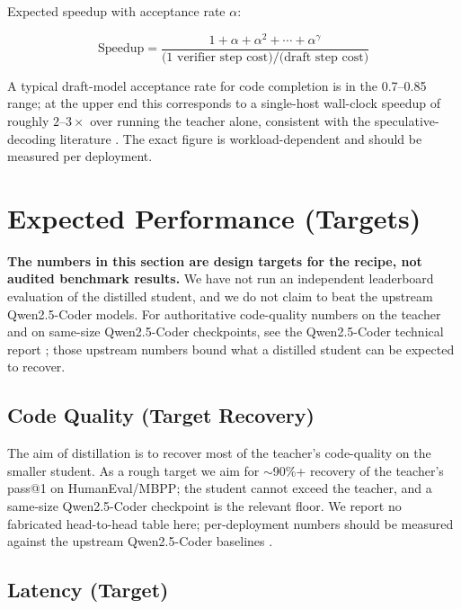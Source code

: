\documentclass[11pt,a4paper]{article}
\begin{document}
Expected speedup with acceptance rate $\alpha$:

\begin{equation}
  \text{Speedup} = \frac{1 + \alpha + \alpha^2 + \cdots + \alpha^\gamma}{\text{(1 verifier step cost)} / \text{(draft step cost)}}
\end{equation}

A typical draft-model acceptance rate for code completion is in the 0.7--0.85 range; at the upper end
this corresponds to a single-host wall-clock speedup of roughly $2$--$3\times$ over running the teacher
alone, consistent with the speculative-decoding literature \cite{leviathan2023speculative,chen2023accelerating}.
The exact figure is workload-dependent and should be measured per deployment.

\section{Expected Performance (Targets)}

\textbf{The numbers in this section are design targets for the recipe, not audited benchmark results.}
We have not run an independent leaderboard evaluation of the distilled student, and we do not claim to
beat the upstream Qwen2.5-Coder models. For authoritative code-quality numbers on the teacher and on
same-size Qwen2.5-Coder checkpoints, see the Qwen2.5-Coder technical report \cite{qwen25coder}; those
upstream numbers bound what a distilled student can be expected to recover.

\subsection{Code Quality (Target Recovery)}

The aim of distillation is to recover most of the teacher's code-quality on the smaller student. As a
rough target we aim for $\sim$90\%+ recovery of the teacher's pass@1 on HumanEval/MBPP; the student
cannot exceed the teacher, and a same-size Qwen2.5-Coder checkpoint is the relevant floor. We report no
fabricated head-to-head table here; per-deployment numbers should be measured against the upstream
Qwen2.5-Coder baselines \cite{qwen25coder}.

\subsection{Latency (Target)}
\end{document}
